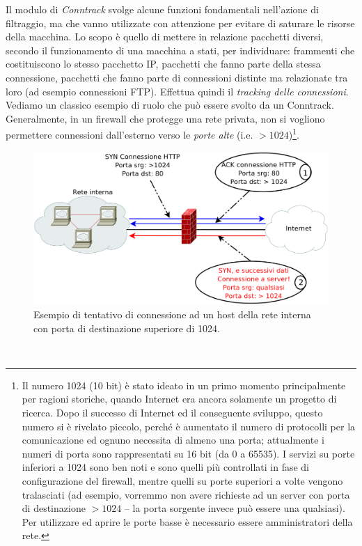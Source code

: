 Il modulo di \textit{Conntrack} svolge alcune funzioni fondamentali nell'azione di filtraggio, ma che vanno utilizzate con attenzione per evitare di saturare le risorse della macchina. Lo scopo è quello di mettere in relazione pacchetti diversi, secondo il funzionamento di una macchina a stati, per individuare: frammenti che costituiscono lo stesso pacchetto IP, pacchetti che fanno parte della stessa connessione, pacchetti che fanno parte di connessioni distinte ma relazionate tra loro (ad esempio connessioni FTP). Effettua quindi il \textit{tracking delle connessioni}. Vediamo un classico esempio di ruolo che può essere svolto da un Conntrack. Generalmente, in un firewall che protegge una rete privata, non si vogliono permettere connessioni dall'esterno verso le \textit{porte alte} (i.e. $>1024$)\footnote{Il numero 1024 (10 bit) è stato ideato in un primo momento principalmente per ragioni storiche, quando Internet era ancora solamente un progetto di ricerca. Dopo il successo di Internet ed il conseguente sviluppo, questo numero si è rivelato piccolo, perché è aumentato il numero di protocolli per la comunicazione ed ognuno necessita di almeno una porta; attualmente i numeri di porta sono rappresentati su 16 bit (da 0 a 65535). I servizi su porte inferiori a 1024 sono ben noti e sono quelli più controllati in fase di configurazione del firewall, mentre quelli su porte superiori a volte vengono tralasciati (ad esempio, vorremmo non avere richieste ad un server con porta di destinazione $>1024$ -- la porta sorgente invece può essere una qualsiasi). Per utilizzare ed aprire le porte basse è necessario essere amministratori della rete.}.
\begin{figure}[htbp]
	\centering
	\includegraphics[scale = 0.3]{images/conntrack-example}
	\caption{Esempio di tentativo di connessione ad un host della rete interna con porta di destinazione superiore di 1024.}
	\label{img:conntrack-example}
\end{figure}\\
